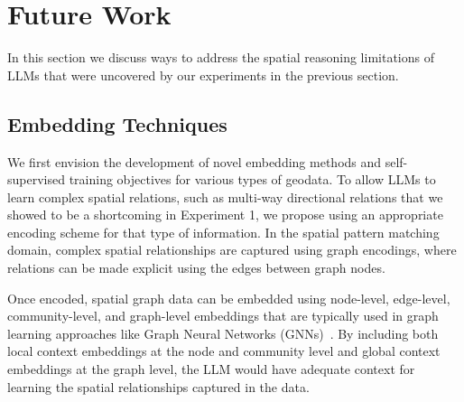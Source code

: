 \section{Future Work}
\label{section:future}

In this section we discuss ways to address the spatial reasoning limitations of LLMs that were uncovered by our experiments in the previous section.

\subsection{Embedding Techniques}
We first envision the development of novel embedding methods and self-supervised training objectives for various types of geodata.
%
%
To allow LLMs to learn complex spatial relations, such as multi-way directional relations that we showed to be a shortcoming in Experiment 1, we propose using an appropriate encoding scheme for that type of information.
In the spatial pattern matching domain, complex spatial relationships are captured using graph encodings, where relations can be made explicit using the edges between graph nodes.


Once encoded, spatial graph data can be embedded using node-level, edge-level, community-level, and graph-level embeddings that are typically used in graph learning approaches like Graph Neural Networks (GNNs)~\cite{Bai2019,Krlevza2016,Liu2020Neural}.
By including both local context embeddings at the node and community level and global context embeddings at the graph level, the LLM would have adequate context for learning the spatial relationships captured in the data.


